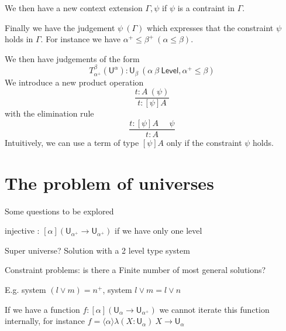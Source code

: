 \documentclass[11pt,a4paper]{article}
\newcommand{\lam}[2]{{\langle}#1{\rangle}#2}
\def\UU{\mathsf{U}}
\def\Level{\mathsf{Level}}
\begin{document}
We then have a new context extension $\Gamma,\psi$ if $\psi$ is a contraint in $\Gamma$.

Finally we have the judgement $\psi~(\Gamma)$ which expresses that the constraint $\psi$
holds in $\Gamma$. For instance we have $\alpha^+\leqslant\beta^+~(\alpha\leqslant\beta)$.

We then have judgements of the form
$$
T_{\alpha^+}^{\beta}(\UU^{\alpha}):\UU_{\beta}~(\alpha~\beta~\Level,\alpha^+\leqslant\beta)
$$
We introduce a new product operation
$$
\frac{t:A~(\psi)}{t:[\psi]A}
$$
with the elimination rule
$$
\frac{t:[\psi]A~~~~~~\psi}{t:A}
$$
Intuitively, we can use a term of type $[\psi]A$ only if the constraint $\psi$ holds.


\section*{The problem of universes}

Some questions to be explored

\medskip

injective : $[\alpha](\UU_{\alpha^+}\rightarrow \UU_{\alpha^+})$ if we have only one level

Super universe? Solution with a 2 level type system

Constraint problems: is there a Finite number of most general solutions?

E.g. system $(l\vee m) = n^+$, system $l\vee m  = l\vee n$

If we have a function $f:[\alpha](\UU_{\alpha}\rightarrow \UU_{\alpha^+})$ we cannot iterate
this function internally, for instance  $f = \lam{\alpha}{\lambda (X:\UU_{\alpha})~X\rightarrow\UU_{\alpha}}$
\end{document}
